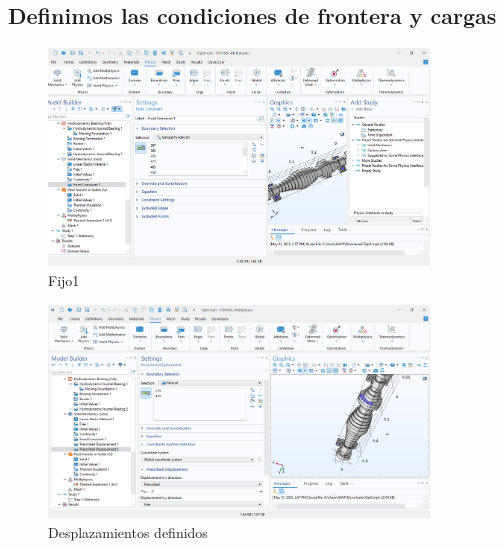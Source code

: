 \documentclass{article}
\theoremstyle{mytheoremstyle}
\theoremstyle{mytheoremstyle}
\theoremstyle{myproblemstyle}
\begin{document}
            \subsection{Definimos las condiciones de frontera y cargas}
             \begin{figure}[H]
              \centering
              \includegraphics[width=0.9\textwidth]{restriccion1.png}
              \caption{Fijo1}
              \label{fig:comsol_cond_fijo1} %
            \end{figure}

             \begin{figure}[H]
              \centering
              \includegraphics[width=0.9\textwidth]{dis1.png}
              \caption{Desplazamientos definidos}
              \label{fig:comsol_cond_desplazamientos} %
            \end{figure}
\end{document}
